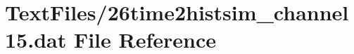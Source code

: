 \hypertarget{26time2histsim__channel15_8dat}{}\section{Text\+Files/26time2histsim\+\_\+channel15.dat File Reference}
\label{26time2histsim__channel15_8dat}
